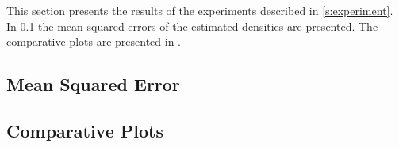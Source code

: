 
This section presents the results of the experiments described in \cref{s:experiment}. In \cref{s:results:mse} the mean squared errors of the estimated densities are presented. The comparative plots are presented in .

\subsection{Mean Squared Error}
\label{s:results:mse}


\subsection{Comparative Plots}
\label{s:results:plots}
